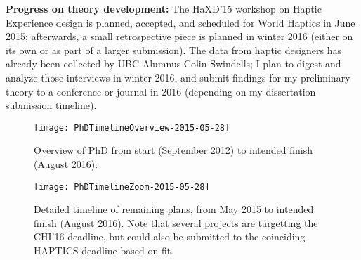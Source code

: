 \textbf{Progress on theory development:}
The HaXD'15 workshop on Haptic Experience design is planned, accepted, and scheduled for World Haptics in June 2015; afterwards, a small retrospective piece is planned in winter 2016 (either on its own or as part of a larger submission).
The data from haptic designers has already been collected by UBC Alumnus Colin Swindells; I plan to digest and analyze those interviews in winter 2016, and submit findings for my preliminary theory to a conference or journal in 2016 (depending on my dissertation submission timeline).


\begin{figure}[htbp] %
   \centering
   \texttt{[image: PhDTimelineOverview-2015-05-28]} 
   \caption{Overview of PhD from start (September 2012) to intended finish (August 2016).}
   \label{fig:timeline:overview}
\end{figure}

\begin{figure}[htbp] %
   \centering
   \texttt{[image: PhDTimelineZoom-2015-05-28]} 
   \caption{Detailed timeline of remaining plans, from May 2015 to intended finish (August 2016). Note that several projects are targetting the CHI'16 deadline, but could also be submitted to the coinciding HAPTICS deadline based on fit.}
   \label{fig:timeline:zoom}
\end{figure}

\endinput
